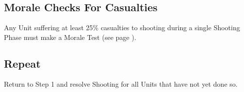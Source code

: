 \subsection{Morale Checks For Casualties}
Any Unit suffering at least 25\% casualties to shooting during a
single Shooting Phase must make a Morale Test (see page
\pageref{sec:morale}).

\subsection{Repeat}
Return to Step 1 and resolve Shooting for all Units that have
not yet done so.

\stopcountsubsections